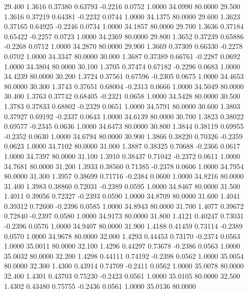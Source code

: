   29.400   1.3616   0.37380   0.63793  -0.2216   0.0752   1.0000  34.0990  80.0000
  29.500   1.3616   0.37219   0.64381  -0.2232   0.0744   1.0000  34.1375  80.0000
  29.600   1.3623   0.37165   0.64925  -0.2246   0.0734   1.0000  34.1857  80.0000
  29.700   1.3636   0.37184   0.65422  -0.2257   0.0723   1.0000  34.2369  80.0000
  29.800   1.3652   0.37239   0.65886  -0.2268   0.0712   1.0000  34.2870  80.0000
  29.900   1.3669   0.37309   0.66330  -0.2278   0.0702   1.0000  34.3347  80.0000
  30.000   1.3687   0.37389   0.66761  -0.2287   0.0692   1.0000  34.3804  80.0000
  30.100   1.3705   0.37474   0.67182  -0.2296   0.0683   1.0000  34.4239  80.0000
  30.200   1.3724   0.37561   0.67596  -0.2305   0.0675   1.0000  34.4653  80.0000
  30.300   1.3743   0.37651   0.68004  -0.2313   0.0666   1.0000  34.5049  80.0000
  30.400   1.3763   0.37742   0.68405  -0.2321   0.0658   1.0000  34.5428  80.0000
  30.500   1.3783   0.37833   0.68802  -0.2329   0.0651   1.0000  34.5791  80.0000
  30.600   1.3803   0.37927   0.69192  -0.2337   0.0643   1.0000  34.6139  80.0000
  30.700   1.3823   0.38022   0.69577  -0.2345   0.0636   1.0000  34.6473  80.0000
  30.800   1.3844   0.38119   0.69955  -0.2352   0.0630   1.0000  34.6794  80.0000
  30.900   1.3866   0.38220   0.70326  -0.2359   0.0623   1.0000  34.7102  80.0000
  31.000   1.3887   0.38325   0.70688  -0.2366   0.0617   1.0000  34.7397  80.0000
  31.100   1.3910   0.38437   0.71042  -0.2372   0.0611   1.0000  34.7681  80.0000
  31.200   1.3933   0.38560   0.71385  -0.2378   0.0606   1.0000  34.7954  80.0000
  31.300   1.3957   0.38699   0.71716  -0.2384   0.0600   1.0000  34.8216  80.0000
  31.400   1.3983   0.38860   0.72031  -0.2389   0.0595   1.0000  34.8467  80.0000
  31.500   1.4011   0.39056   0.72327  -0.2393   0.0590   1.0000  34.8709  80.0000
  31.600   1.4041   0.39312   0.72600  -0.2396   0.0585   1.0000  34.8943  80.0000
  31.700   1.4077   0.39672   0.72840  -0.2397   0.0580   1.0000  34.9173  80.0000
  31.800   1.4121   0.40247   0.73031  -0.2396   0.0576   1.0000  34.9407  80.0000
  31.900   1.4188   0.41459   0.73114  -0.2389   0.0570   1.0000  34.9678  80.0000
  32.000   1.4293   0.44453   0.73170  -0.2374   0.0563   1.0000  35.0011  80.0000
  32.100   1.4296   0.44297   0.73678  -0.2386   0.0563   1.0000  35.0032  80.0000
  32.200   1.4298   0.44111   0.74192  -0.2398   0.0562   1.0000  35.0054  80.0000
  32.300   1.4300   0.43914   0.74709  -0.2411   0.0562   1.0000  35.0078  80.0000
  32.400   1.4301   0.43703   0.75230  -0.2423   0.0561   1.0000  35.0105  80.0000
  32.500   1.4302   0.43480   0.75755  -0.2436   0.0561   1.0000  35.0136  80.0000
